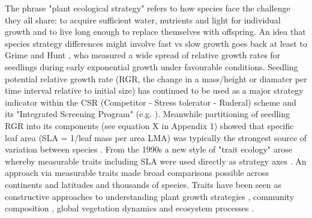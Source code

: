 \documentclass[a4paper]{article}\usepackage[]{graphicx}\usepackage[]{color}
\begin{document}
The phrase "plant ecological strategy" refers to how species face the challenge they all share:  to acquire sufficient water, nutrients and light for individual growth and to live long enough to replace themselves with offspring. An idea that species strategy differences might involve fast vs slow growth goes back at least to Grime and Hunt \citeyearpar{Grime:1975gr}, who measured a wide spread of relative growth rates for seedlings during early exponential growth under favourable conditions. Seedling potential relative growth rate (RGR, the change in a mass/height or diamater per time interval relative to initial size) has continued to be used as a major strategy indicator within the CSR (Competitor - Stress tolerator - Ruderal) scheme and its "Integrated Screening Program" (e.g. \citealt{grime1979plant, Grime:1997wm}). Meanwhile partitioning of seedling RGR into its components (see equation X in Appendix 1) showed that specific leaf area (SLA = 1/leaf mass per area LMA) was typically the strongest source of variation between species \citep{Poorter:1989tx}. From the 1990s a new style of "trait ecology" arose whereby measurable traits including SLA were used directly as strategy axes \citep{Westoby:2002ft}. An approach via measurable traits made broad comparisons possible across continents and latitudes and thousands of species. Traits have been seen as constructive approaches to understanding plant growth strategies \citep{Grime:1977kc,Chapin:1980gz}, community composition \citep{Lavorel:2002ff,Shipley:2006ie}, global vegetation dynamics \citep{Scheiter:2013ed} and ecosystem processes \citep{Lavorel:2002ff}.
\end{document}
